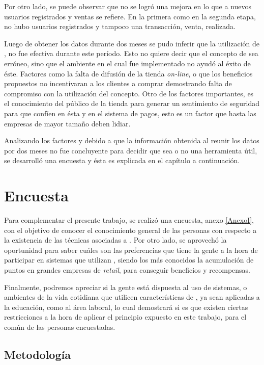 Por otro lado, se puede observar que no se logró una mejora en lo que a nuevos
usuarios registrados y ventas se refiere.
En la primera como en la segunda etapa, no hubo usuarios registrados y tampoco
una transacción, venta, realizada.

Luego de obtener los datos durante dos meses se pudo inferir que la utilización
de {\gam}, no fue efectiva durante este período. Esto no quiere decir que el concepto
de {\gam} sea erróneo, sino que el ambiente en el cual fue implementado no ayudó
al éxito de éste. Factores como la falta de difusión de la tienda \emph{on-line},
 o que los beneficios propuestos no incentivaran a
 los clientes a comprar demostrando falta de compromiso con la utilización del
concepto. Otro de los factores importantes, es el conocimiento del público de la tienda 
para generar un sentimiento de seguridad para que confíen en ésta y en el sistema de pagos, 
esto es un factor que hasta las empresas de mayor tamaño deben lidiar.

Analizando los factores y debido a que la información obtenida al reunir los datos por dos
 meses no fue concluyente para decidir que {\gam} sea o no una herramienta útil, se
desarrolló una encuesta y ésta es explicada en el capítulo a continuación.

\section{Encuesta}

Para complementar el presente trabajo, se realizó una encuesta, anexo \ref{AnexoI}, con el objetivo de
conocer el conocimiento general de las personas con respecto a la existencia
de las técnicas asociadas a {\gam}.
Por otro lado, se aprovechó la oportunidad para saber cuáles son las preferencias
que tiene la gente a la hora de participar en sistemas que utilizan {\gam},
siendo los más conocidos la acumulación de puntos en grandes empresas de \emph{retail},
para conseguir beneficios y recompensas.

Finalmente, podremos apreciar si la gente está dispuesta al uso de sistemas,
o ambientes de la vida cotidiana que utilicen características de {\gam},
ya sean aplicadas a la educación, como al área laboral, lo cual demostrará
 si es que existen ciertas restricciones a la hora de aplicar
el principio expuesto en este trabajo, para el común de las personas
encuestadas.

\subsection{Metodología}

